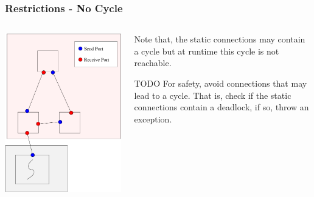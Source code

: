\documentclass[compress,xcolor=dvipsnames,10pt]{beamer}
\begin{document}
\begin{frame}
\frametitle{Restrictions - No Cycle}
\begin{columns}
\begin{column}{0.4\textwidth}
\begin{center}
\includegraphics[scale=0.35]{restrictionNoCycle.pdf}
\end{center}
\end{column}
\begin{column}{0.6\textwidth}
Note that, the static connections may contain a cycle but at runtime this cycle is not reachable. 
\begin{block}{TODO}
For safety, avoid connections that may lead to a cycle. That is, check if the static connections contain a deadlock, if so, throw an exception.  
\end{block}
\end{column}
\end{columns}

\end{frame}
\end{document}

